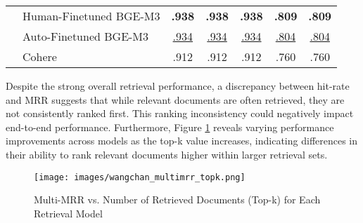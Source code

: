 \begin{table}[!h]
\begin{tabular}{@{}clccccc@{}}
      & Human-Finetuned BGE-M3 & \textbf{.938}            & \textbf{.938}                  & \textbf{.938}                & \textbf{.809}             & \textbf{.809}                   \\
      & Auto-Finetuned BGE-M3  & \underline{.934}               & \underline{.934}                     & \underline{.934}                   & \underline{.804}                & \underline{.804}                      \\
      & Cohere                 & .912                     & .912                           & .912                         & .760                      & .760                            \\ \bottomrule

\end{tabular}
\end{table}



Despite the strong overall retrieval performance, a discrepancy between hit-rate and MRR suggests that while relevant documents are often retrieved, they are not consistently ranked first. This ranking inconsistency could negatively impact end-to-end performance. Furthermore, Figure \ref{fig: wangchan_mrr_vs_topk} reveals varying performance improvements across models as the top-k value increases, indicating differences in their ability to rank relevant documents higher within larger retrieval sets.

\begin{figure}[!h]
  \centering
  \texttt{[image: images/wangchan\_multimrr\_topk.png]}
  \caption{Multi-MRR vs. Number of Retrieved Documents (Top-k) for Each Retrieval Model}
  \label{fig: wangchan_mrr_vs_topk}
\end{figure}




